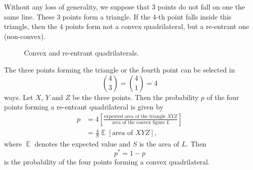 \documentclass{article}
\DeclareMathOperator{\E}{\mathbb{E}}
\begin{document}
Without any loss of generality, we suppose that $3$ points do not fall on one the same line.
These $3$ points form a triangle.
If the $4$-th point falls inside this triangle, then the $4$ points form not a convex quadrilateral, but a re-entrant one (non-convex).
\begin{figure}[ht]
    \centering
    \begin{minipage}[b]{0.2\textwidth}
    \end{minipage}
    \begin{minipage}[b]{0.1\textwidth}
    \end{minipage}
    \caption{Convex and re-entrant quadrilaterals.}
\end{figure}
The three points forming the triangle or the fourth point can be selected in
\begin{equation*}
    \binom{4}{3} = \binom{4}{1} = 4
\end{equation*}
ways.
Let $X$, $Y$ and $Z$ be the three points.
Then the probability $p$ of the four points forming a re-entrant quadrilateral is given by
\begin{equation*}
    \begin{aligned}
        p &= 4\left[\frac{\text{expexted area of the triangle }XYZ}{\text{area of the convex figure } L}\right] 
        \\
        &= \frac{4}{S}\E[\text{area of } XYZ],
    \end{aligned}
\end{equation*}
where $\E$ denotes the expected value and $S$ is the area of $L$.
Then
\begin{equation*}
    p^{*} = 1 - p
\end{equation*}
is the probability of the four points forming a convex quadrilateral.
\end{document}

